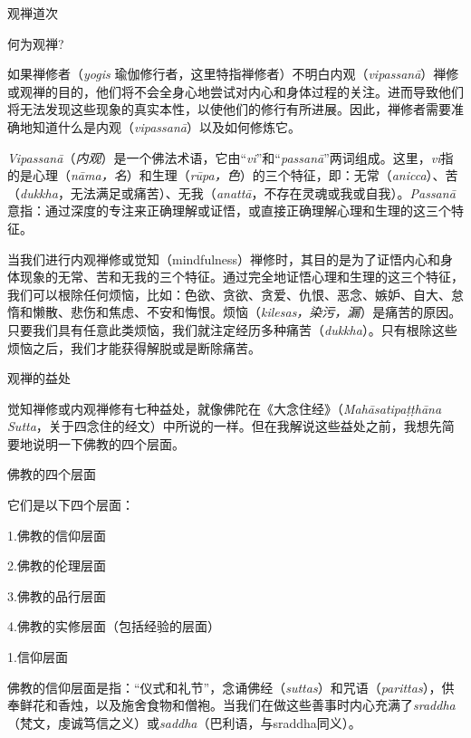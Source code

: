 


\beginchapter 观禅道次


\subsectnon \1何为观禅?

如果禅修者（{\it yogis} 瑜伽修行者，这里特指禅修者）不明白内观（{\it vipassan\=a\/}）禅修或观禅的目的，他们将不会全身心地尝试对内心和身体过程的关注。进而导致他们将无法发现这些现象的真实本性，以使他们的修行有所进展。因此，禅修者需要准确地知道什么是内观（{\it vipassan\=a}）以及如何修炼它。

{\it Vipassan\=a\/}（{\it 内观}）是一个佛法术语，它由“{\it vi}”和“{\it passan\=a}”两词组成。这里，{\it vi}指的是心理（{\it n\=ama，名}）和生理（{\it r\=upa，色}）的三个特征，即：无常（{\it anicca}）、苦（{\it dukkha}，无法满足或痛苦）、无我（{\it anatt\=a}，不存在灵魂或我或自我）。{\it Passan\=a}意指：通过深度的专注来正确理解或证悟，或直接正确理解心理和生理的这三个特征。

当我们进行内观禅修或觉知（mindfulness）禅修时，其目的是为了证悟内心和身体现象的无常、苦和无我的三个特征。通过完全地证悟心理和生理的这三个特征，我们可以根除任何烦恼，比如：色欲、贪欲、贪爱、仇恨、恶念、嫉妒、自大、怠惰和懒散、悲伤和焦虑、不安和悔恨。烦恼（{\it kilesas，染污，漏}）是痛苦的原因。只要我们具有任意此类烦恼，我们就注定经历多种痛苦\1（{\it dukkha}）。只有根除这些烦恼之后，我们才能获得解脱或是断除痛苦。

\subsectnon 观禅的益处

觉知禅修或内观禅修有七种益处，就像佛陀在《大念住经》（{\it Mah\=asatipa\d t\d th\=ana Sutta}，关于四念住的经文）中所说的一样。但在我解说这些益处之前，我想先简要地说明一下佛教的四个层面。

\ssubsectnon 佛教的四个层面

它们是以下四个层面：
\smallskip

{
\leftskip=1.6pc
\item{1.}佛教的信仰层面
\item{2.}佛教的伦理层面
\item{3.}佛教的品行层面
\item{4.}佛教的实修层面（包括经验的层面）

}
\bigskip

\sssubsectnon 1.信仰层面

佛教的信仰层面是指：“仪式和礼节”，念诵佛经（{\it suttas}）和咒语（{\it parittas}），供奉鲜花和香烛，以及施舍食物和僧袍。当我们在做这些善事时内心充满了{\it sraddha}（梵文，虔诚笃信之义）或{\it saddha}（巴利语，与sraddha同义）。


